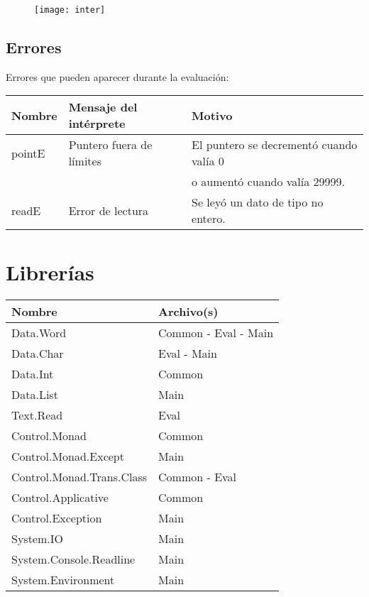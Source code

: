 \documentclass[a4paper, 12pt]{article}
\begin{document}
\begin{figure}[h]
\texttt{[image: inter]}
\centering
\end{figure}

\subsection*{Errores}
Errores que pueden aparecer durante la evaluación:
\begin{center}
\begin{tabular}{ |l|l|l| } 
 \hline
 Nombre & Mensaje del intérprete & Motivo \\
 \hline
 pointE & Puntero fuera de límites & El puntero se decrementó cuando valía 0 \\
        &                          & o aumentó cuando valía 29999. \\
 readE & Error de lectura & Se leyó un dato de tipo no entero. \\
 \hline
\end{tabular}
\end{center}




\section*{Librerías}
\begin{center}
\begin{tabular}{ |l|l| } 
 \hline
 Nombre & Archivo(s) \\
 \hline
 Data.Word & Common - Eval - Main \\
 Data.Char & Eval - Main \\
 Data.Int & Common \\
 Data.List & Main \\
 Text.Read & Eval \\
 Control.Monad & Common \\
 Control.Monad.Except & Main \\ 
 Control.Monad.Trans.Class & Common - Eval \\
 Control.Applicative & Common \\
 Control.Exception & Main \\ 
 System.IO & Main \\ 
 System.Console.Readline & Main \\ 
 System.Environment & Main \\ 
 \hline
\end{tabular}
\end{center}

\newpage
\nocite{*}
\printbibliography[title={Referencias}]
\end{document}
